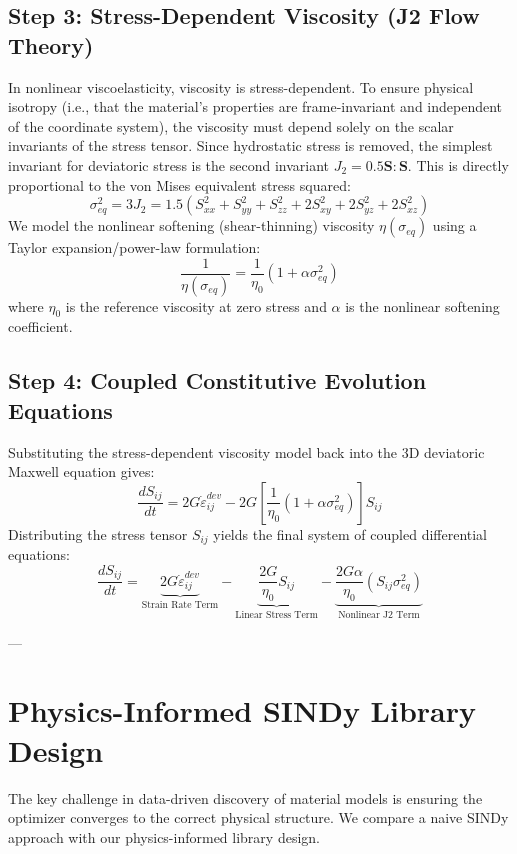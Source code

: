 \documentclass{article}
\begin{document}
\subsection{Step 3: Stress-Dependent Viscosity (J2 Flow Theory)}
In nonlinear viscoelasticity, viscosity is stress-dependent. To ensure physical isotropy (i.e., that the material's properties are frame-invariant and independent of the coordinate system), the viscosity must depend solely on the scalar invariants of the stress tensor. Since hydrostatic stress is removed, the simplest invariant for deviatoric stress is the second invariant $J_2 = 0.5 \mathbf{S} : \mathbf{S}$. This is directly proportional to the von Mises equivalent stress squared:
\begin{equation}
    \sigma_{eq}^2 = 3 J_2 = 1.5 \left( S_{xx}^2 + S_{yy}^2 + S_{zz}^2 + 2 S_{xy}^2 + 2 S_{yz}^2 + 2 S_{xz}^2 \right)
\end{equation}
We model the nonlinear softening (shear-thinning) viscosity $\eta(\sigma_{eq})$ using a Taylor expansion/power-law formulation:
\begin{equation}
    \frac{1}{\eta(\sigma_{eq})} = \frac{1}{\eta_0}(1 + \alpha \sigma_{eq}^2)
\end{equation}
where $\eta_0$ is the reference viscosity at zero stress and $\alpha$ is the nonlinear softening coefficient.

\subsection{Step 4: Coupled Constitutive Evolution Equations}
Substituting the stress-dependent viscosity model back into the 3D deviatoric Maxwell equation gives:
\begin{equation}
    \frac{dS_{ij}}{dt} = 2G\dot{\varepsilon}^{dev}_{ij} - 2G\left[ \frac{1}{\eta_0}(1 + \alpha \sigma_{eq}^2) \right]S_{ij}
\end{equation}
Distributing the stress tensor $S_{ij}$ yields the final system of coupled differential equations:
\begin{equation}
    \frac{dS_{ij}}{dt} = \underbrace{2G \dot{\varepsilon}^{dev}_{ij}}_{\text{Strain Rate Term}} - \underbrace{\frac{2G}{\eta_0} S_{ij}}_{\text{Linear Stress Term}} - \underbrace{\frac{2G\alpha}{\eta_0} (S_{ij} \sigma_{eq}^2)}_{\text{Nonlinear J2 Term}}
\end{equation}

---

\section{Physics-Informed SINDy Library Design}
The key challenge in data-driven discovery of material models is ensuring the optimizer converges to the correct physical structure. We compare a naive SINDy approach with our physics-informed library design.
\end{document}
